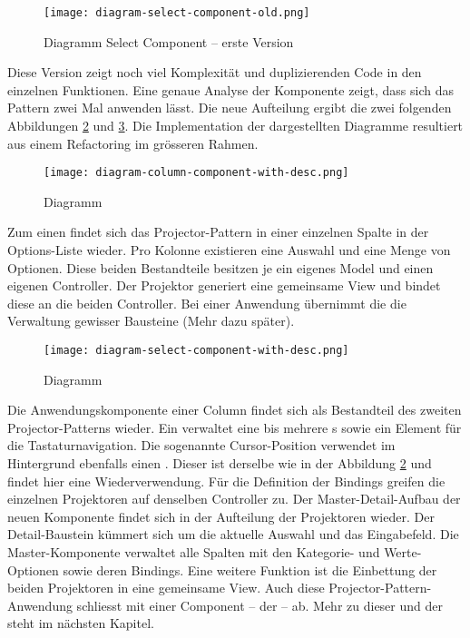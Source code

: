 \begin{figure}[!htb]
    \centering
    \texttt{[image: diagram-select-component-old.png]}
    \caption{\centering Diagramm Select Component – erste Version}
    \label{img:diagramSelectComponentOld}
\end{figure}

Diese Version zeigt noch viel Komplexität und duplizierenden Code in den einzelnen Funktionen. 
Eine genaue Analyse der Komponente zeigt, dass sich das Pattern zwei Mal anwenden lässt. 
Die neue Aufteilung ergibt die zwei folgenden Abbildungen \ref{img:diagramColumnComponent} und \ref{img:diagramSelectComponent}. 
Die Implementation der dargestellten Diagramme resultiert aus einem Refactoring im grösseren Rahmen. 

\begin{figure}[!htb]
    \centering
    \texttt{[image: diagram-column-component-with-desc.png]}
    \caption{\centering Diagramm }
    \label{img:diagramColumnComponent}
\end{figure}

Zum einen findet sich das Projector-Pattern in einer einzelnen Spalte in der Options-Liste wieder. 
Pro Kolonne existieren eine Auswahl und eine Menge von Optionen. 
Diese beiden Bestandteile besitzen je ein eigenes Model und einen eigenen Controller. 
Der Projektor generiert eine gemeinsame View und bindet diese an die beiden Controller. 
Bei einer Anwendung übernimmt die  die Verwaltung gewisser Bausteine (Mehr dazu später). 

\begin{figure}[!htb]
    \centering
    \texttt{[image: diagram-select-component-with-desc.png]}
    \caption{\centering Diagramm }
    \label{img:diagramSelectComponent}
\end{figure}

Die Anwendungskomponente einer Column findet sich als Bestandteil des zweiten Projector-Patterns wieder. 
Ein  verwaltet eine bis mehrere s sowie ein Element für die Tastaturnavigation. 
Die sogenannte Cursor-Position verwendet im Hintergrund ebenfalls einen . 
Dieser ist derselbe wie in der Abbildung \ref{img:diagramColumnComponent} und findet hier eine Wiederverwendung. 
Für die Definition der Bindings greifen die einzelnen Projektoren auf denselben Controller zu. 
Der Master-Detail-Aufbau der neuen Komponente findet sich in der Aufteilung der Projektoren wieder. 
Der Detail-Baustein kümmert sich um die aktuelle Auswahl und das Eingabefeld. 
Die Master-Komponente verwaltet alle Spalten mit den Kategorie- und Werte-Optionen sowie deren Bindings. 
Eine weitere Funktion ist die Einbettung der beiden Projektoren in eine gemeinsame View. 
Auch diese Projector-Pattern-Anwendung schliesst mit einer Component – der  – ab. 
Mehr zu dieser und der  steht im nächsten Kapitel. 


